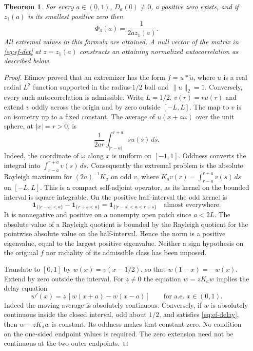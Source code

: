 \documentclass[11pt,a4paper]{article}
\newtheorem{theorem}{Theorem}[section]\newtheorem{lemma}[theorem]{Lemma}\newtheorem{proposition}[theorem]{Proposition}\newtheorem{corollary}[theorem]{Corollary}
\numberwithin{equation}{section}
\begin{document}
\begin{theorem}\label{thm:ef-all}
For every $a\in(0,1)$, $D_a(0)\ne0$, a positive zero exists, and if $z_1(a)$ is its smallest positive zero then
\begin{equation}
  \Phi_3(a)=\frac1{2a z_1(a)}.
  \label{eq:ef-value}
\end{equation}
All extremal values in this formula are attained. A null vector of the matrix in \eqref{eq:ef-det} at $z=z_1(a)$ constructs an attaining normalized autocorrelation as described below.
\end{theorem}

\begin{proof}
Efimov proved that an extremizer has the form $f=u*\widetilde u$, where $u$ is a real radial $L^2$ function supported in the radius-$1/2$ ball and $\|u\|_2=1$. Conversely, every such autocorrelation is admissible. Write $L=1/2$, $v(r)=r u(r)$ and extend $v$ oddly across the origin and by zero outside $[-L,L]$. The map to $v$ is an isometry up to a fixed constant. The average of $u(x+a\omega)$ over the unit sphere, at $|x|=r>0$, is
\[
 \frac1{2ar}\int_{|r-a|}^{r+a}s u(s)\,ds.
\]
Indeed, the coordinate of $\omega$ along $x$ is uniform on $[-1,1]$. Oddness converts the integral into $\int_{r-a}^{r+a}v(s)\,ds$. Consequently the extremal problem is the absolute Rayleigh maximum for $(2a)^{-1}K_a$ on odd $v$, where $K_a v(r)=\int_{r-a}^{r+a}v(s)\,ds$ on $[-L,L]$. This is a compact self-adjoint operator, as its kernel on the bounded interval is square integrable. On the positive half-interval the odd kernel is
\[
 \mathbf1_{\{|r-s|<a\}}-\mathbf1_{\{r+s<a\}}
   =\mathbf1_{\{|r-s|<a<r+s\}}\quad\text{almost everywhere}.
\]
It is nonnegative and positive on a nonempty open patch since $a<2L$. The absolute value of a Rayleigh quotient is bounded by the Rayleigh quotient for the pointwise absolute value on the half-interval. Hence the norm is a positive eigenvalue, equal to the largest positive eigenvalue. Neither a sign hypothesis on the original $f$ nor radiality of its admissible class has been imposed.

Translate to $[0,1]$ by $w(x)=v(x-1/2)$, so that $w(1-x)=-w(x)$. Extend by zero outside the interval. For $z\ne0$ the equation $w=zK_aw$ implies the delay equation
\begin{equation}
 w'(x)=z\,[w(x+a)-w(x-a)]\qquad\text{for a.e. }x\in(0,1).
 \label{eq:ef-delay}
\end{equation}
Indeed the moving average is absolutely continuous. Conversely, if $w$ is absolutely continuous inside the closed interval, odd about $1/2$, and satisfies \eqref{eq:ef-delay}, then $w-zK_aw$ is constant. Its oddness makes that constant zero. No condition on the one-sided endpoint values is required. The zero extension need not be continuous at the two outer endpoints.


\end{proof}
\end{document}
